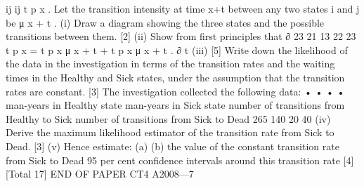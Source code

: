 ij
ij
t p x . Let the transition intensity at time x+t between any two states i and j be μ x + t .
(i) Draw a diagram showing the three states and the possible transitions between
them.
[2]
(ii) Show from first principles that
∂
23
21 13
22 23
t p x = t p x μ x + t + t p x μ x + t .
∂ t
(iii)
[5]
Write down the likelihood of the data in the investigation in terms of the
transition rates and the waiting times in the Healthy and Sick states, under the
assumption that the transition rates are constant.
[3]
The investigation collected the following data:
•
•
•
•
man-years in Healthy state
man-years in Sick state
number of transitions from Healthy to Sick
number of transitions from Sick to Dead
265
140
20
40
(iv) Derive the maximum likelihood estimator of the transition rate from Sick to
Dead.
[3]
(v) Hence estimate:
(a)
(b)
the value of the constant transition rate from Sick to Dead
95 per cent confidence intervals around this transition rate
[4]
[Total 17]
END OF PAPER
CT4 A2008—7
